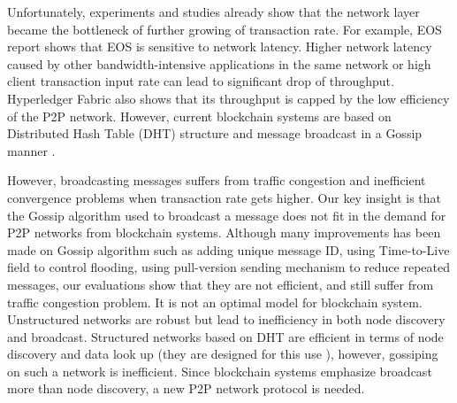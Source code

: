 Unfortunately, experiments and studies \cite{cachin2016architecture, xueos, li2018scaling} already show that the network layer became the bottleneck of further growing of transaction rate. For example, EOS report \cite{xueos} shows that EOS is sensitive to network latency. Higher network latency caused by other bandwidth-intensive applications in the same network or high client transaction input rate can lead to significant drop of throughput. Hyperledger Fabric \cite{cachin2016architecture} also shows that its throughput is capped by the low efficiency of the P2P network. However, current blockchain systems are based on Distributed Hash Table (DHT) structure and message broadcast in a Gossip manner \cite{eugster2004epidemic}. 

However, broadcasting messages suffers from traffic congestion and inefficient convergence problems when transaction rate gets higher. Our key insight is that the Gossip algorithm used to broadcast a message does not fit in the demand for P2P networks from blockchain systems. Although many improvements has been made on Gossip algorithm such as adding unique message ID, using Time-to-Live field to control flooding, using pull-version sending mechanism to reduce repeated messages, our evaluations show that they are not efficient, and still suffer from traffic congestion problem. It is not an optimal model for blockchain system. Unstructured networks are robust but lead to inefficiency in both node discovery and broadcast. Structured networks based on DHT are efficient in terms of node discovery and data look up (they are designed for this use \cite{stoica2001chord}), however, gossiping on such a network is inefficient. Since blockchain systems emphasize broadcast more than node discovery, a new P2P network protocol is needed.

